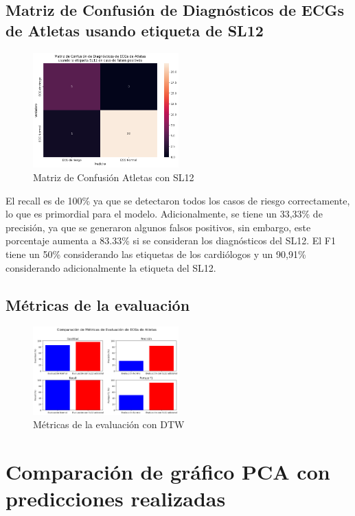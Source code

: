 \documentclass[conference]{IEEEtran}
\begin{document}
\subsection{Matriz de Confusión de Diagnósticos de ECGs de Atletas usando etiqueta de SL12}
\begin{figure}[H]
    \includegraphics[width=0.5\textwidth]{./graficos/matrizConfusionAtletasSL12.png}
    \caption{Matriz de Confusión Atletas con SL12}
\end{figure}

El recall es de 100\% ya que se detectaron todos los casos de riesgo correctamente, 
lo que es primordial para el modelo. Adicionalmente, se tiene un 33,33\% de precisión, 
ya que se generaron algunos falsos positivos, sin embargo, este porcentaje aumenta a 83.33\% 
si se consideran los diagnósticos del SL12. El F1 tiene un 50\% considerando las etiquetas de
 los cardiólogos y un 90,91\% considerando adicionalmente la etiqueta del SL12.

\subsection{Métricas de la evaluación}
\begin{figure}[H]
    \includegraphics[width=0.5\textwidth]{./graficos/metricasDTW.png}
    \caption{Métricas de la evaluación con DTW}
\end{figure}

\section{Comparación de gráfico PCA con predicciones realizadas}
\end{document}
